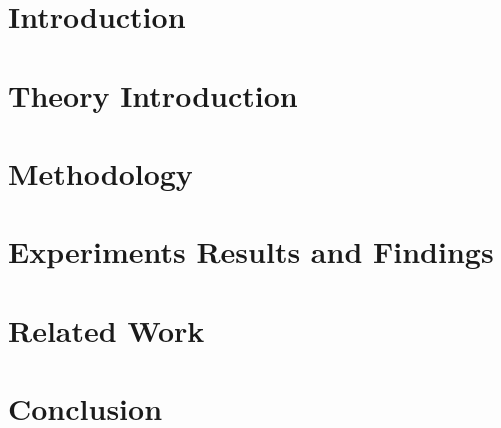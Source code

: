 \chapter{Introduction}\label{ch:introduction}


\chapter{Theory Introduction}\label{ch:first_chapter}


\chapter{Methodology}\label{ch:second_chapter}


\chapter{Experiments Results and Findings}\label{ch:experiments}


\chapter{Related Work}\label{ch:impl-bench}


\chapter{Conclusion}\label{ch:conclusion}

